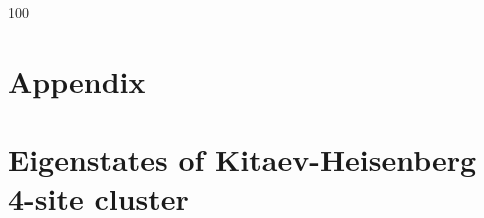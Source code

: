 \documentclass[aps,amsmath,twocolumn,amssymb,floatfix,showpacs,superscriptaddress,nofootinbib,longbibliography]{revtex4-1}
\begin{document}
\begin{thebibliography}{100}
\end{thebibliography}
\section{Appendix}
\label{appendix}
\appendix
{}
\setcounter{defcounter}{0}

\vspace{20pt}
\section{Eigenstates of Kitaev-Heisenberg 4-site cluster}{\label{App:A}}
\end{document}

